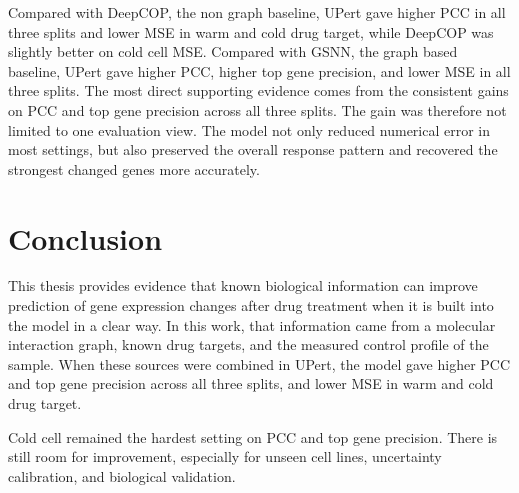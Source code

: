\noindent Compared with DeepCOP, the non graph baseline, UPert gave higher PCC in all three splits and lower MSE in warm and cold drug target, while DeepCOP was slightly better on cold cell MSE. Compared with GSNN, the graph based baseline, UPert gave higher PCC, higher top gene precision, and lower MSE in all three splits. The most direct supporting evidence comes from the consistent gains on PCC and top gene precision across all three splits. The gain was therefore not limited to one evaluation view. The model not only reduced numerical error in most settings, but also preserved the overall response pattern and recovered the strongest changed genes more accurately.

\section{Conclusion}

\noindent This thesis provides evidence that known biological information can improve prediction of gene expression changes after drug treatment when it is built into the model in a clear way. In this work, that information came from a molecular interaction graph, known drug targets, and the measured control profile of the sample. When these sources were combined in UPert, the model gave higher PCC and top gene precision across all three splits, and lower MSE in warm and cold drug target.

\noindent Cold cell remained the hardest setting on PCC and top gene precision. There is still room for improvement, especially for unseen cell lines, uncertainty calibration, and biological validation.
